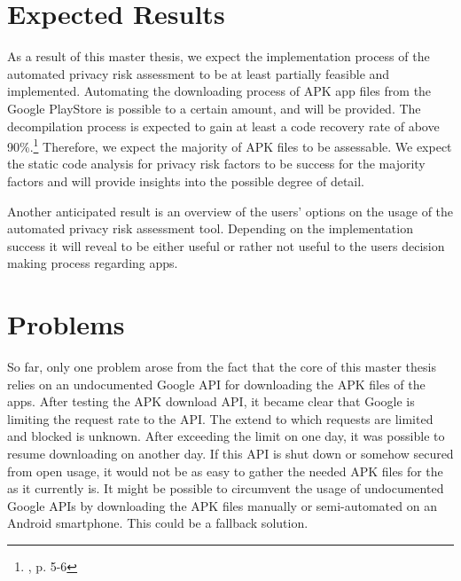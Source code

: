 \documentclass[
	a4paper,
	oneside,
	12pt,
	liststotocnumbered
]{article}
\let\cite\textcite
\begin{document}
\section{Expected Results}

As a result of this master thesis, we expect the implementation process of the automated privacy risk assessment to be at least partially feasible and implemented. 
Automating the downloading process of \acs{APK} app files from the Google PlayStore is possible to a certain amount, and will be provided.
The decompilation process is expected to gain at least a code recovery rate of above 90\%.\footnote{\cite{Enck2011}, p. 5-6} 
Therefore, we expect the majority of \acs{APK} files to be assessable.
We expect the static code analysis for privacy risk factors to be success for the majority factors and will provide insights into the possible degree of detail.

Another anticipated result is an overview of the users' options on the usage of the automated privacy risk assessment tool. 
Depending on the implementation success it will reveal to be either useful or rather not useful to the users decision making process regarding \mH apps.

\section{Problems}
So far, only one problem arose from the fact that the core of this master thesis relies on an undocumented Google \acs{API} for downloading the \acs{APK} files of the apps. 
After testing the \acs{APK} download \acs{API}, it became clear that Google is limiting the request rate to the API. 
The extend to which requests are limited and blocked is unknown.
After exceeding the limit on one day, it was possible to resume downloading on another day.
If this \acs{API} is shut down or somehow secured from open usage, it would not be as easy to gather the needed \acs{APK} files for the \sca as it currently is.
It might be possible to circumvent the usage of undocumented Google \acs{API}s by downloading the \acs{APK} files manually or semi-automated on an Android smartphone. 
This could be a fallback solution.

\newpage
\printbibliography[title={References}]
\end{document}
